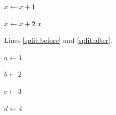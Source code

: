 \documentclass{article}
\begin{document}
\begin{algorithm}
\begin{algorithmic}[2]
\algrenewcommand\algorithmicindent{1em}
\algrenewcommand\algorithmicindent{2em}
\State $x\gets x+1$\label{split:before}
\end{algorithmic}
\begin{algorithmic}[1]
\algrenewcommand\algorithmicindent{4em}
\State $x\gets x+2$\label{split:after}
\EndIf
\State \Return $x$
\EndProcedure
\end{algorithmic}
\end{algorithm}
Lines \ref{split:before} and \ref{split:after}.
\begin{algorithmic}[1]
\State $a\gets 1$
\end{algorithmic}
\begin{algorithmic}
\State $b\gets 2$
\end{algorithmic}
\begin{algorithmic}
\State $c\gets 3$
\end{algorithmic}
\begin{algorithmic}
\State $d\gets 4$
\end{algorithmic}
\end{document}

